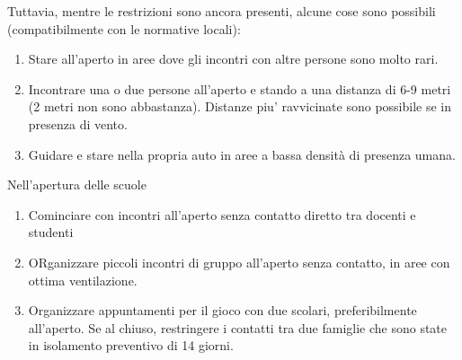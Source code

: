 \documentclass[onecolumn,journal]{IEEEtran}
\begin{document}
\begin{multicols}{2}
Tuttavia, mentre le restrizioni sono ancora presenti, alcune cose  sono possibili (compatibilmente con le normative locali):
\begin{enumerate}
  \item Stare all'aperto in aree dove gli incontri con altre persone sono molto rari.
  \item Incontrare una o due persone all'aperto e stando a una distanza di 6-9 metri (2 metri non sono abbastanza). Distanze piu' ravvicinate sono possibile se in presenza di vento.
  \item Guidare e stare nella propria auto in aree a bassa densità di presenza umana.
\end{enumerate}

Nell'apertura delle scuole
\begin{enumerate}
  \item Cominciare con incontri all'aperto senza contatto diretto tra docenti e studenti
  \item ORganizzare piccoli incontri di gruppo all'aperto senza contatto, in aree con ottima ventilazione.
  \item Organizzare appuntamenti per il gioco con due scolari, preferibilmente all'aperto. Se al chiuso, restringere i contatti tra due famiglie che sono state in isolamento preventivo di 14 giorni.
\end{enumerate}

\end{multicols}




% 
\end{document}
